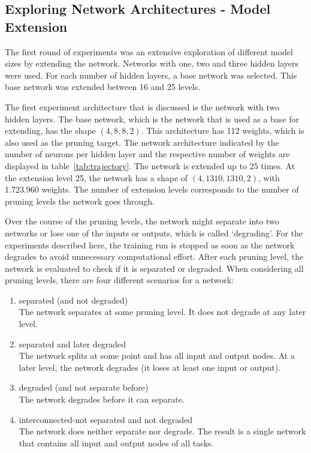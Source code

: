 \subsection{Exploring Network Architectures - Model Extension}\label{two-hidden}

The first round of experiments was an extensive exploration of different model sizes by extending the network.
Networks with one, two and three hidden layers were used.
For each number of hidden layers, a base network was selected.
This base network was extended between 16 and 25 levels.

The first experiment architecture that is discussed is the network with two hidden layers.
The base network, which is the network that is used as a base for extending, has the shape $(4,8,8,2)$.
This architecture has 112 weights, which is also used as the pruning target.
The network architecture indicated by the number of neurons per hidden layer and the respective number of weights are displayed in table~\ref{tab:trajectory}.
The network is extended up to 25 times.
At the extension level 25, the network has a shape of $(4,1310,1310,2)$, with 1.723.960 weights.
The number of extension levels corresponds to the number of pruning levels the network goes through.

Over the course of the pruning levels, the network might separate into two networks or lose one of the inputs or outputs, which is called `degrading'.
For the experiments described here, the training run is stopped as soon as the network degrades to avoid unnecessary computational effort.
After each pruning level, the network is evaluated to check if it is separated or degraded.
When considering all pruning levels, there are four different scenarios for a network:

\begin{enumerate}
\item separated (and not degraded)\\
The network separates at some pruning level. 
It does not degrade at any later level. 
\item separated and later degraded \\
The network splits at some point and has all input and output nodes.
At a later level, the network degrades (it loses at least one input or output).
\item degraded (and not separate before) \\
The network degrades before it can separate.
\item interconnected-not separated and not degraded \\
The network does neither separate nor degrade. 
The result is a single network that contains all input and output nodes of all tasks.
\end{enumerate}

